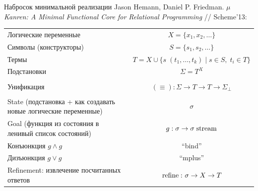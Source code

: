 \documentclass[10pt, mathserif]{beamer}
\let\\\tabularnewline
\let\\\tabularnewline
\newcommand{\inml}[1]{\mbox{\lstinline{#1}}}
\theoremstyle{definition}
\begin{document}
\begin{frame}[fragile]{Набросок минимальной реализации}
Jason Hemann, Daniel P. Friedman. \emph{$\mu$Kanren: A Minimal Functional
Core for Relational Programming} // Scheme'13:
\vskip5mm
\small
\pause
\begin{tabular}{p{5cm}c}
Логические переменные  & $X=\{x_1,x_2,\dots\}$ \vspace*{-\baselineskip} \\
Символы (конструкторы) & $S=\{s_1,s_2,\dots\}$ \vspace*{-\baselineskip} \\
Термы                  & $T=X\cup\{s\;(t_1,\dots,t_k)\mid s\in S,\; t_i \in T\}$ \vspace*{-\baselineskip} \\
Подстановки            & $\Sigma=T^X$ \vspace*{-\baselineskip} \\
\\\pause
Унификация & $(\equiv)\colon\Sigma\to T\to T\to\Sigma_\perp$ \vspace*{-\baselineskip}\\
\\\pause
State (подстановка + как создавать новые логические переменные) & $\sigma$ \vspace*{-\baselineskip}\\
Goal (функция из состояния в ленивый список состояний) & $g : \sigma\to\sigma\;\inml{stream}$ \vspace*{-\baselineskip} \\
Конъюнкция $g \wedge g$ & ``bind''  \vspace*{-\baselineskip} \\
Дизъюнкция $g \vee   g$ & ``mplus'' \vspace*{-\baselineskip} \\

Refinement: извлечение посчитанных ответов & $\inml{refine} \colon \sigma\to X\to T$ \vspace*{-\baselineskip}
\end{tabular}

\end{frame}
\end{document}
